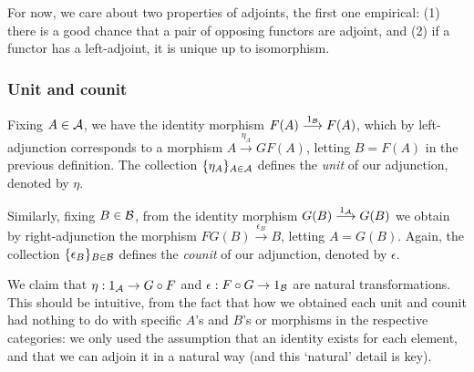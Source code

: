 For now, we care about two properties of adjoints, the first one empirical: (1) there is a good chance that a pair of opposing functors are adjoint, and (2) if a functor has a left-adjoint, it is unique up to isomorphism.


\subsubsection{Unit and counit}
Fixing $A\in\mathcal{A}$, we have the identity morphism $F(A) \overset{1_{\mathcal{B}}}{\longrightarrow} F(A)$, which by left-adjunction corresponds to a morphism $A \overset{\eta_A}{\longrightarrow} GF(A)$, letting $B=F(A)$ in the previous definition. The collection $\{\eta_A\}_{A\in\mathcal{A}}$ defines the \emph{unit} of our adjunction, denoted by $\eta$.

Similarly, fixing $B\in\mathcal{B}$, from the identity morphism $G(B) \overset{1_{\mathcal{A}}}{\longrightarrow} G(B)$ we obtain by right-adjunction the morphism $FG(B) \overset{\epsilon_B}{\longrightarrow} B$, letting $A=G(B)$. Again, the collection $\{\epsilon_B\}_{B\in\mathcal{B}}$ defines the \emph{counit} of our adjunction, denoted by $\epsilon$.

We claim that $\eta : 1_{\mathcal{A}} \to G\circ F$ and $\epsilon : F\circ G \to 1_{\mathcal{B}}$ are natural transformations. This should be intuitive, from the fact that how we obtained each unit and counit had nothing to do with specific $A$'s and $B$'s or morphisms in the respective categories: we only used the assumption that an identity exists for each element, and that we can adjoin it in a natural way (and this `natural' detail is key).

